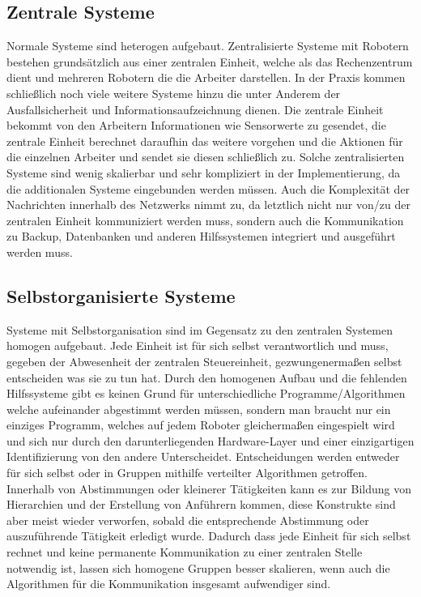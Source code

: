 \subsection*{Zentrale Systeme}\label{subsec:ZentraleSysteme}

Normale Systeme sind heterogen aufgebaut.
Zentralisierte Systeme mit Robotern bestehen grundsätzlich aus einer zentralen Einheit, welche als das Rechenzentrum dient und mehreren Robotern die die Arbeiter darstellen.
In der Praxis kommen schließlich noch viele weitere Systeme hinzu die unter Anderem der Ausfallsicherheit und Informationsaufzeichnung dienen.
Die zentrale Einheit bekommt von den Arbeitern Informationen wie Sensorwerte zu gesendet, die zentrale Einheit berechnet daraufhin das weitere vorgehen und die Aktionen für die einzelnen Arbeiter und sendet sie diesen schließlich zu.
Solche zentralisierten Systeme sind wenig skalierbar und sehr kompliziert in der Implementierung, da die additionalen Systeme eingebunden werden müssen.
Auch die Komplexität der Nachrichten innerhalb des Netzwerks nimmt zu, da letztlich nicht nur von/zu der zentralen Einheit kommuniziert werden muss, sondern auch die Kommunikation zu Backup, Datenbanken und anderen Hilfssystemen integriert und ausgeführt werden muss.

\subsection*{Selbstorganisierte Systeme}\label{subsec:SelbstorganisierteSysteme}

Systeme mit Selbstorganisation sind im Gegensatz zu den zentralen Systemen homogen aufgebaut.
Jede Einheit ist für sich selbst verantwortlich und muss, gegeben der Abwesenheit der zentralen Steuereinheit, gezwungenermaßen selbst entscheiden was sie zu tun hat.
Durch den homogenen Aufbau und die fehlenden Hilfssysteme gibt es keinen Grund für unterschiedliche Programme/Algorithmen welche aufeinander abgestimmt werden müssen, sondern man braucht nur ein einziges Programm, welches auf jedem Roboter gleichermaßen eingespielt wird und sich nur durch den darunterliegenden Hardware-Layer und einer einzigartigen Identifizierung von den andere Unterscheidet.
Entscheidungen werden entweder für sich selbst oder in Gruppen mithilfe verteilter Algorithmen getroffen.
Innerhalb von Abstimmungen oder kleinerer Tätigkeiten kann es zur Bildung von Hierarchien und der Erstellung von Anführern kommen, diese Konstrukte sind aber meist wieder verworfen, sobald die entsprechende Abstimmung oder auszuführende Tätigkeit erledigt wurde.
Dadurch dass jede Einheit für sich selbst rechnet und keine permanente Kommunikation zu einer zentralen Stelle notwendig ist, lassen sich homogene Gruppen besser skalieren, wenn auch die Algorithmen für die Kommunikation insgesamt aufwendiger sind.

